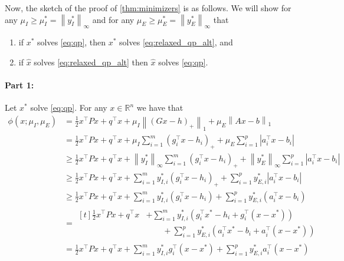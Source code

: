 \documentclass{article} %
\newcommand{\R}{\mathbb{R}}
\newcommand{\norm}[1]{\left\lVert#1\right\rVert}
\begin{document}
Now, the sketch of the proof of \cref{thm:minimizers} is as follows. We will show for any $\mu_I \geq \mu_I^* = \norm{y_I^*}_\infty$ and for any $\mu_E \geq \mu_E^* = \norm{y_E^*}_\infty$ that
\begin{enumerate}
    \item if $x^*$ solves \cref{eq:qp}, then $x^*$ solves \cref{eq:relaxed_qp_alt}, and
    \item if $\hat{x}$ solves \cref{eq:relaxed_qp_alt} then $\hat{x}$ solves \cref{eq:qp}.
\end{enumerate}

\paragraph{Part 1:} Let $x^*$ solve \cref{eq:qp}. For any $x \in \R^n$ we have that
\begin{subequations}
\begin{align}
    \phi(x; \mu_I, \mu_E) &= \frac{1}{2} x^\top P x + q^\top x + \mu_I \norm{(Gx - h)_+}_1 + \mu_E \norm{Ax - b}_1
    \label{eq: phi ineqs - subeq 0}
    \\
    &= \frac{1}{2} x^\top P x + q^\top x + \mu_I \sum_{i = 1}^m (g_i^\top x - h_i)_+ + \mu_E \sum_{i = 1}^p |a_i^\top x - b_i|
    \label{eq: phi ineqs - subeq 1}
    \\
    &\geq \frac{1}{2} x^\top P x + q^\top x + \norm{y_I^*}_\infty \sum_{i = 1}^m (g_i^\top x - h_i)_+ + \norm{y_E^*}_\infty \sum_{i = 1}^p |a_i^\top x - b_i|
    \label{eq: phi ineqs - subeq 2}
    \\
    &\geq \frac{1}{2} x^\top P x + q^\top x + \sum_{i = 1}^m y_{I,i}^* (g_i^\top x - h_i)_+ + \sum_{i = 1}^p y_{E,i}^* |a_i^\top x - b_i|
    \label{eq: phi ineqs - subeq 3}
    \\
    &\geq \frac{1}{2} x^\top P x + q^\top x + \sum_{i = 1}^m y_{I,i}^* (g_i^\top x - h_i) + \sum_{i = 1}^p y_{E,i}^* (a_i^\top x - b_i)
    \label{eq: phi ineqs - subeq 4}
    \\
    &= \begin{aligned}[t]
        \frac{1}{2} x^\top P x + q^\top x & + \sum_{i = 1}^m y_{I,i}^* (g_i^\top x^* - h_i + g_i^\top(x - x^*)) \\
        & \hspace{2em} + \sum_{i = 1}^p y_{E,i}^* (a_i^\top x^* - b_i + a_i^\top(x - x^*))
    \end{aligned}
    \label{eq: phi ineqs - subeq 5}
    \\
    &= \frac{1}{2} x^\top P x + q^\top x + \sum_{i = 1}^m y_{I,i}^* g_i^\top(x - x^*) + \sum_{i = 1}^p y_{E,i}^* a_i^\top(x - x^*)

\end{align}
\end{subequations}
\end{document}
